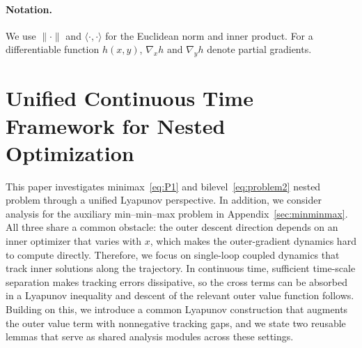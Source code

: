 \documentclass{article}
\newcommand{\1}{\mathbf{1}}
\begin{document}
\paragraph{Notation.}
We use $\|\cdot\|$ and $\langle\cdot,\cdot\rangle$ for the Euclidean norm and inner product.
For a differentiable function $h(x,y)$, $\nabla_x h$ and $\nabla_y h$ denote partial gradients.
\section{Unified Continuous Time Framework for Nested Optimization}\label{sec:unified}
This paper investigates minimax~\ref{eq:P1} and bilevel~\ref{eq:problem2} nested problem through a unified Lyapunov perspective. In addition, we consider analysis for the auxiliary min--min--max problem in Appendix~\ref{sec:minminmax}.
All three share a common obstacle: the outer descent direction depends on an inner optimizer that varies with $x$, which makes the outer-gradient dynamics hard to compute directly.
Therefore, we focus on single-loop coupled dynamics that track inner solutions along the trajectory.
In continuous time, sufficient time-scale separation makes tracking errors dissipative, so the cross terms can be absorbed in a Lyapunov inequality and descent of the relevant outer value function follows.
Building on this, we introduce a common Lyapunov construction that augments the outer value term with nonnegative tracking gaps, and we state two reusable lemmas that serve as shared analysis modules across these settings.
\end{document}
